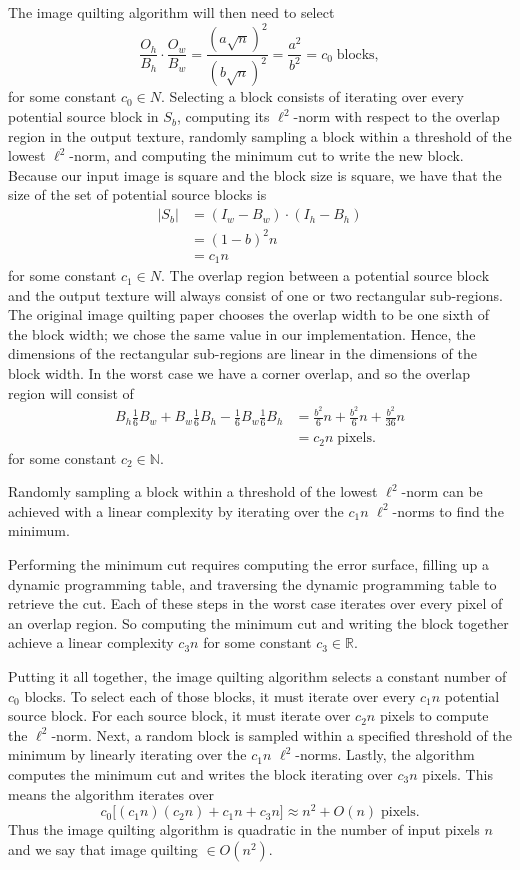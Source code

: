 \documentclass[letterpaper]{article}
\newcommand{\R}[0]{\mathbb{R}}
\newcommand{\N}[0]{\mathbb{N}}
\begin{document}
The image quilting algorithm will then need to select
\[
  \frac{O_h}{B_h} \cdot \frac{O_w}{B_w} = \frac{(a \sqrt{n})^2}{(b \sqrt{n})^2} = \frac{a^2}{b^2} = c_0 \; \text{blocks},
\]
for some constant $c_0 \in N$. Selecting a block consists of iterating over every potential source block in $S_b$, computing its $\ell ^2$-norm with respect to the overlap region in the output texture, randomly sampling a block within a threshold of the lowest $\ell ^2$-norm, and computing the minimum cut to write the new block. Because our input image is square and the block size is square, we have that the size of the set of potential source blocks is
\begin{align*}
  |S_b| & = (I_w - B_w) \cdot (I_h - B_h) \\
  & = (1-b) ^2 n \\
  & = c_1 n
\end{align*}
for some constant $c_1 \in N$. The overlap region between a potential source block and the output texture will always consist of one or two rectangular sub-regions. The original image quilting paper chooses the overlap width to be one sixth of the block width; we chose the same value in our implementation. Hence, the dimensions of the rectangular sub-regions are linear in the dimensions of the block width. In the worst case we have a corner overlap, and so the overlap region will consist of
\begin{align*}
  B_h \frac{1}{6} B_w + B_w \frac{1}{6} B_h - \frac{1}{6} B_w \frac{1}{6} B_h & = \frac{b^2}{6} n + \frac{b^2}{6} n + \frac{b^2}{36} n \\ & = c_2 n \; \text{pixels}.
\end{align*}
for some constant $c_2 \in \N$.

Randomly sampling a block within a threshold of the lowest $\ell ^2$-norm can be achieved with a linear complexity by iterating over the $c_1 n$ $\ell ^2$-norms to find the minimum.

Performing the minimum cut requires computing the error surface, filling up a dynamic programming table, and traversing the dynamic programming table to retrieve the cut. Each of these steps in the worst case iterates over every pixel of an overlap region. So computing the minimum cut and writing the block together achieve a linear complexity $c_3 n$ for some constant $c_3 \in \R$.

Putting it all together, the image quilting algorithm selects a constant number of $c_0$ blocks. To select each of those blocks, it must iterate over every $c_1 n$ potential source block. For each source block, it must iterate over $c_2 n$ pixels to compute the $\ell ^2$-norm. Next, a random block is sampled within a specified threshold of the minimum by linearly iterating over the $c_1 n$ $\ell ^2$-norms. Lastly, the algorithm computes the minimum cut and writes the block iterating over $c_3 n$ pixels. This means the algorithm iterates over
\[
  c_0 \big [(c_1 n)(c_2 n) + c_1 n + c_3 n \big ] \approx n^2 + O(n) \; \text{pixels}.
\]
Thus the image quilting algorithm is quadratic in the number of input pixels $n$ and we say that image quilting $ \in O(n^2)$.
\end{document}
